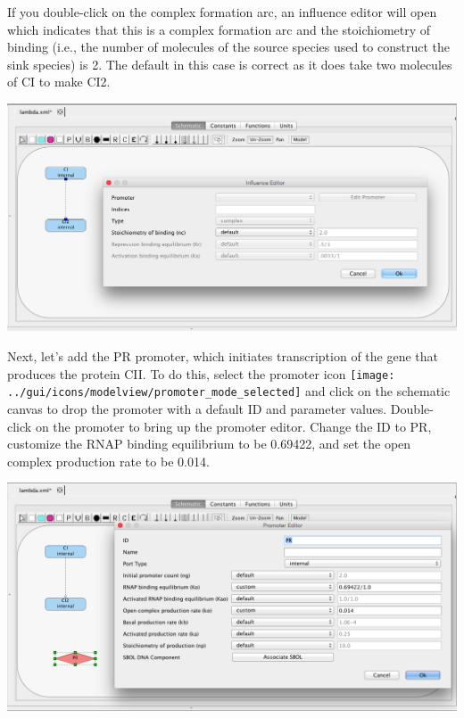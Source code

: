 \documentclass[titlepage,11pt]{article}
\begin{document}
If you double-click on the complex formation arc, an influence editor will open which indicates that this is a complex formation arc and the stoichiometry of binding (i.e., the number of molecules of the source species used to construct the sink species) is 2.  The default in this case is correct as it does take two molecules of CI to make CI2.

\begin{center}
\includegraphics[width=160mm]{screenshots/complex} 
\end{center}

Next, let's add the PR promoter, which initiates transcription of the gene that produces the protein CII.  To do this, select the promoter icon \texttt{[image: ../gui/icons/modelview/promoter\_mode\_selected]} and click on the schematic canvas to drop the promoter with a default ID and parameter values.  Double-click on the promoter to bring up the promoter editor.  Change the ID to PR, customize the RNAP binding equilibrium to be 0.69422, and set the open complex production rate to be 0.014. 
 
\begin{center}
\includegraphics[width=160mm]{screenshots/promoter} 
\end{center}
\end{document}
